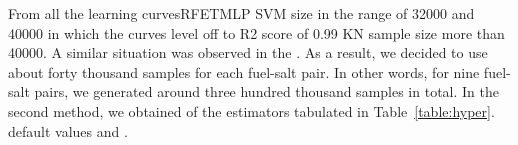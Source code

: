     \DIFaddend From all the learning curves\DIFdelbegin {}\DIFdelend \DIFaddbegin {}\DIFaddend \gls{RF}\DIFdelbegin {}\DIFdelend \DIFaddbegin \DIFadd{, }\DIFaddend \gls{ET}\DIFdelbegin {}\DIFdelend \DIFaddbegin \DIFadd{, }\DIFaddend \gls{MLP}\DIFdelbegin {}%
\DIFdelend \DIFaddbegin {}\gls{SVM} \DIFaddend size in the range of 32000 and 40000 in which the curves level off to \DIFdelbegin {}\DIFdelend \DIFaddbegin {}\gls{R2} \DIFaddend score of 0.99 \DIFdelbegin {}\DIFdelend \DIFaddbegin {}\DIFaddend \gls{KN} \DIFdelbegin {}\DIFdelend \DIFaddbegin {}\DIFaddend sample size more than 40000. A similar situation was observed in the \DIFdelbegin {}\DIFdelend \DIFaddbegin {}\DIFaddend . As a result, we \DIFdelbegin {}\DIFdelend decided to use about forty thousand samples for each fuel-salt pair. In other words, for nine fuel-salt pairs, we generated around three hundred thousand samples in total. In the second method, we obtained \DIFdelbegin {}\DIFdelend \DIFaddbegin {}\DIFaddend of the estimators tabulated in Table~\ref{table:hyper}. \DIFdelbegin {}\DIFdelend \DIFaddbegin {}\DIFaddend default values and \DIFdelbegin {}\DIFdelend \DIFaddbegin {}\DIFaddend .

